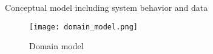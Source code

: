 Conceptual model including system behavior and data
\begin{figure}[h]
	\centering
	\caption{Domain model}
	\texttt{[image: domain\_model.png]}
\end{figure}